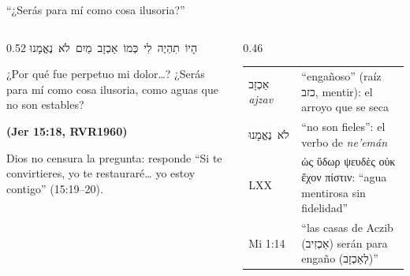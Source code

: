 \documentclass[hyperref={bookmarks=false},aspectratio=169]{beamer}
\newcommand{\heb}[1]{\mbox{\foreignlanguage{hebrew}{#1}}}
\newcommand{\grc}[1]{\foreignlanguage{ancientgreek}{#1}}
\newcommand{\fuente}[1]{\par\hfill{\upshape\bfseries\footnotesize\textcolor{azul}{#1}}}
\begin{document}
\begin{frame}{``¿Serás para mí como cosa ilusoria?''}
\begin{columns}[t,onlytextwidth]
\begin{column}{0.52\textwidth}
\centering\heb{הָיוֹ תִהְיֶה לִי כְּמוֹ אַכְזָב מַיִם לֹא נֶאֱמָנוּ}
\begin{cita}¿Por qué fue perpetuo mi dolor\ldots? ¿Serás para mí como cosa ilusoria, como aguas que no son estables?\fuente{(Jer 15:18, RVR1960)}\end{cita}
\scriptsize Dios no censura la pregunta: responde ``Si te convirtieres, yo te restauraré\ldots{} yo estoy contigo'' (15:19--20).
\end{column}
\begin{column}{0.46\textwidth}\scriptsize\renewcommand{\arraystretch}{1.12}
\begin{tabular}{@{}>{\RaggedRight\arraybackslash}p{2.0cm}>{\RaggedRight\arraybackslash}p{3.5cm}@{}}
\toprule
\heb{אַכְזָב} \emph{ajzav} & ``engañoso'' (raíz \heb{כזב}, mentir): el arroyo que se seca \\
\heb{לֹא נֶאֱמָנוּ} & ``no son fieles'': el verbo de \emph{ne'emán} \\
LXX & \grc{ὡς ὕδωρ ψευδὲς οὐκ ἔχον πίστιν}: ``agua mentirosa sin fidelidad'' \\
Mi 1:14 & ``las casas de Aczib (\heb{אַכְזִיב}) serán para engaño (\heb{לְאַכְזָב})'' \\
\bottomrule
\end{tabular}
\end{column}
\end{columns}
\end{frame}
\end{document}
